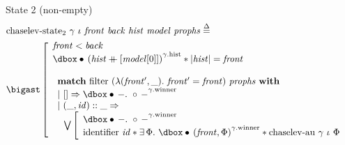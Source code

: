 \begin{frame}{State 2 (non-empty)}
\small
\begin{align*}
		&\mathrm{chaselev \mathhyphen state_2}\ \gamma\ \iota\ \mathit{front}\ \mathit{back}\ \mathit{hist}\ \mathit{model}\ \mathit{prophs}
		\eqdef
	\\
		&\iBigsep\left[\begin{array}{l}
				\mathit{front} < \mathit{back}
			\\
				\iGhost{\gamma\mathrm{.hist}}{\iAuth{(\mathit{hist} \mdoubleplus [\mathit{model} [0]])}} \iSep
				| \mathit{hist} | = \mathit{front}
			\\\\
				\begin{array}{l}
						\bold{match}\ \mathrm{filter}\ (\lambda (\mathit{front'}, \_) .\ \mathit{front'} = \mathit{front})\ \mathit{prophs}\ \bold{with}
					\\
						|\ [] \Rightarrow
						\iGhost{\gamma\mathrm{.winner}}{\iAuth{-} .\ \iFrag{-}}
					\\
						|\ (\_, \mathit{id}) :: \_ \Rightarrow
					\\
						\ \ 
						\bigvee\left[\begin{array}{l}
								\iGhost{\gamma\mathrm{.winner}}{\iAuth{-} .\ \iFrag{-}}
							\\
								\mathrm{identifier}\ \mathit{id} \iSep
								\exists \Phi .\ 
								\iGhost{\gamma\mathrm{.winner}}{\iAuth{(\mathit{front}, \Phi)}} \iSep
								\mathrm{chaselev \mathhyphen au}\ \gamma\ \iota\ \Phi
						\end{array}\right.
				\end{array}
		\end{array}\right.
\end{align*}
\end{frame}


